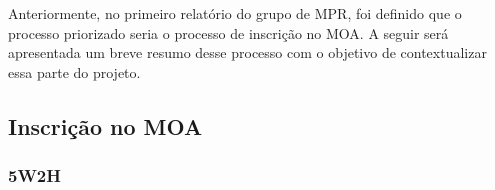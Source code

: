 Anteriormente, no primeiro relatório do grupo de MPR, foi definido que o processo priorizado seria o processo de inscrição no MOA. A seguir será apresentada um breve resumo desse processo com o objetivo de contextualizar essa parte do projeto.

\subsection[Inscrição no MOA]{Inscrição no MOA}
\label{subsec:contexto_processoMelhorar_inscricaoMOA}
	

	\subsubsection[5W2H]{5W2H}
	\label{subsubsec:contexto_processoMelhorar_inscricaoMOA_5w2h}
		